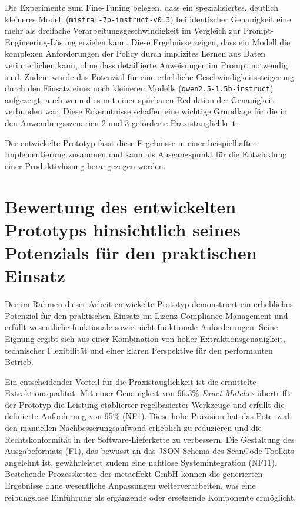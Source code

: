 Die Experimente zum Fine-Tuning belegen, dass ein spezialisiertes, deutlich kleineres Modell (\texttt{mistral-7b-instruct-v0.3}) bei identischer Genauigkeit eine mehr als dreifache Verarbeitungsgeschwindigkeit im Vergleich zur Prompt-Engineering-Lösung erzielen kann.
Diese Ergebnisse zeigen, dass ein Modell die komplexen Anforderungen der Policy durch implizites Lernen aus Daten verinnerlichen kann, ohne dass detaillierte Anweisungen im Prompt notwendig sind.
Zudem wurde das Potenzial für eine erhebliche Geschwindigkeitssteigerung durch den Einsatz eines noch kleineren Modells (\texttt{qwen2.5-1.5b-instruct}) aufgezeigt, auch wenn dies mit einer spürbaren Reduktion der Genauigkeit verbunden war.
Diese Erkenntnisse schaffen eine wichtige Grundlage für die in den Anwendungsszenarien 2 und 3 geforderte Praxistauglichkeit.

Der entwickelte Prototyp fasst diese Ergebnisse in einer beispielhaften Implementierung zusammen und kann als Ausgangspunkt für die Entwicklung einer Produktivlösung herangezogen werden.


\section{Bewertung des entwickelten Prototyps hinsichtlich seines Potenzials für den
praktischen Einsatz}

Der im Rahmen dieser Arbeit entwickelte Prototyp demonstriert ein erhebliches Potenzial für den praktischen Einsatz im Lizenz-Compliance-Management und erfüllt wesentliche funktionale sowie nicht-funktionale Anforderungen.
Seine Eignung ergibt sich aus einer Kombination von hoher Extraktionsgenauigkeit, technischer Flexibilität und einer klaren Perspektive für den performanten Betrieb.

Ein entscheidender Vorteil für die Praxistauglichkeit ist die ermittelte Extraktionsqualität.
Mit einer Genauigkeit von \num{96,3}\% \textit{Exact Matches} übertrifft der Prototyp die Leistung etablierter regelbasierter Werkzeuge und erfüllt die definierte Anforderung von \num{95}\% (NF1).
Diese hohe Präzision hat das Potenzial, den manuellen Nachbesserungsaufwand erheblich zu reduzieren und die Rechtskonformität in der Software-Lieferkette zu verbessern.
Die Gestaltung des Ausgabeformats (F1), das bewusst an das JSON-Schema des ScanCode-Toolkits angelehnt ist, gewährleistet zudem eine nahtlose Systemintegration (NF11).
Bestehende Prozessketten der metaeffekt GmbH können die generierten Ergebnisse ohne wesentliche Anpassungen weiterverarbeiten, was eine reibungslose Einführung als ergänzende oder ersetzende Komponente ermöglicht.

